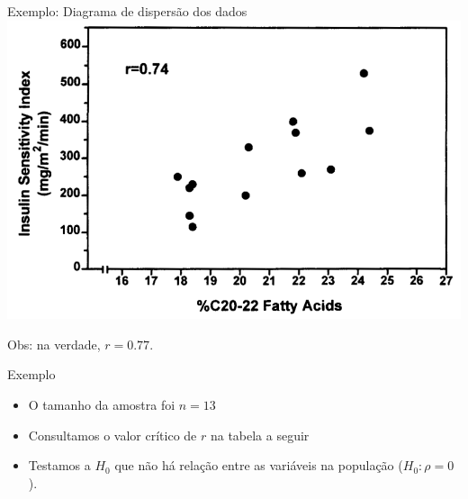 \documentclass{beamer}
\begin{document}
\begin{frame}{Exemplo: Diagrama de dispersão dos dados}
  \includegraphics[width=\textwidth]{Assoc/scatter}

  Obs: na verdade, $r=0.77$.
\end{frame}

\begin{frame}{Exemplo}
  \begin{itemize}
  \item O tamanho da amostra foi $n=13$
  \item Consultamos o valor crítico de $r$ na tabela a seguir
  \item Testamos a $H_0$ que não há relação entre as variáveis na
    população ($H_0: \rho = 0$).
  \end{itemize}
\end{frame}
\end{document}
